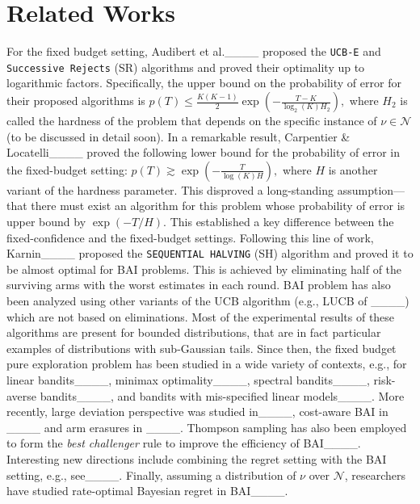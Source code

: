\section{Related Works}
For the fixed budget setting, Audibert et al.____ proposed the \texttt{UCB-E} and \texttt{Successive Rejects} (SR) algorithms and proved their optimality up to logarithmic factors. Specifically, the upper bound on the probability of error for their proposed algorithms is
    $p(T) \leq \frac{K (K-1)}{2} \exp\left(- \frac{T - K}{\log_2 (K) H_2}\right),$
where $H_2$ is called the hardness of the problem that depends on the specific instance of $\nu \in \mathcal{N}$ (to be discussed in detail soon). In a remarkable result, Carpentier \& Locatelli____ proved the following lower bound for the probability of error in the fixed-budget setting:
       $p(T) \gtrsim \exp\left(-\frac{T}{\log(K) H}\right),$
where $H$ is another variant of the hardness parameter. This disproved a long-standing assumption—that there must exist an algorithm for this problem whose probability of error is upper bound by $\exp(-T/H)$. This established a key difference between the fixed-confidence and the fixed-budget settings. Following this line of work, Karnin____ proposed the \texttt{SEQUENTIAL HALVING} ({SH}) algorithm and proved it to be almost optimal for BAI problems. This is achieved by eliminating half of the surviving arms with the worst estimates in each round. \ac{BAI} problem has also been analyzed using other variants of the \ac{UCB} algorithm (e.g., LUCB of ____) which are not based on eliminations. Most of the experimental results of these algorithms are present for bounded distributions, that are in fact particular examples of distributions with sub-Gaussian tails. Since then, the fixed budget pure exploration problem has been studied in a wide variety of contexts, e.g., for linear bandits____, minimax optimality____, spectral bandits____, risk-averse bandits____, and bandits with mis-specified linear models____. More recently, large deviation perspective was studied in____, cost-aware BAI in ____ and arm erasures in ____. Thompson sampling has also been employed to form the {\it best challenger} rule to improve the efficiency of \ac{BAI}____. Interesting new directions include combining the regret setting with the BAI setting, e.g., see____. Finally, assuming a distribution of $\nu$ over $\mathcal{N}$, researchers have studied rate-optimal Bayesian regret in \ac{BAI}____.